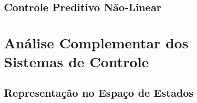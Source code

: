 
\subsection{Controle Preditivo Não-Linear}


\section{Análise Complementar dos Sistemas de Controle}


\subsection{Representação no Espaço de Estados}

